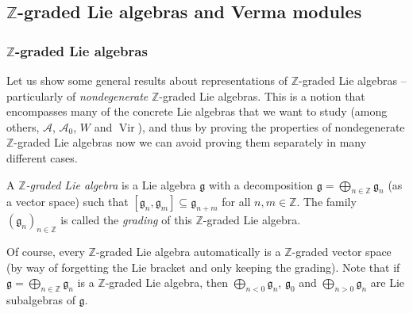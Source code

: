 \documentclass[etingof-lie.tex]{subfiles}
\begin{document}
\subsection{\texorpdfstring{$\mathbb{Z}$}{Z}-graded Lie algebras and Verma
modules}

\subsubsection{\texorpdfstring{$\mathbb{Z}$}{Z}-graded Lie algebras}

Let us show some general results about representations of $\mathbb{Z}$-graded
Lie algebras -- particularly of \textit{nondegenerate} $\mathbb{Z}$-graded Lie
algebras. This is a notion that encompasses many of the concrete Lie algebras
that we want to study (among others, $\mathcal{A}$, $\mathcal{A}_{0}$, $W$ and
$\operatorname*{Vir}$), and thus by proving the properties of nondegenerate
$\mathbb{Z}$-graded Lie algebras now we can avoid proving them separately in
many different cases.

\begin{definition}
\label{def.gradLie}A $\mathbb{Z}$\textit{-graded Lie algebra} is a Lie algebra
$\mathfrak{g}$ with a decomposition $\mathfrak{g}=\bigoplus\limits_{n\in
\mathbb{Z}}\mathfrak{g}_{n}$ (as a vector space) such that $\left[
\mathfrak{g}_{n},\mathfrak{g}_{m}\right]  \subseteq\mathfrak{g}_{n+m}$ for all
$n,m\in\mathbb{Z}$. The family $\left(  \mathfrak{g}_{n}\right)
_{n\in\mathbb{Z}}$ is called the \textit{grading} of this $\mathbb{Z}$-graded
Lie algebra.\footnotemark
\end{definition}

 Of course, every $\mathbb{Z}$-graded
Lie algebra automatically is a $\mathbb{Z}$-graded vector space (by way of
forgetting the Lie bracket and only keeping the grading). Note that if
$\mathfrak{g}=\bigoplus\limits_{n\in\mathbb{Z}}\mathfrak{g}_{n}$ is a
$\mathbb{Z}$-graded Lie algebra, then $\bigoplus\limits_{n<0}\mathfrak{g}_{n}%
$, $\mathfrak{g}_{0}$ and $\bigoplus\limits_{n>0}\mathfrak{g}_{n}$ are Lie
subalgebras of $\mathfrak{g}$.
\end{document}
